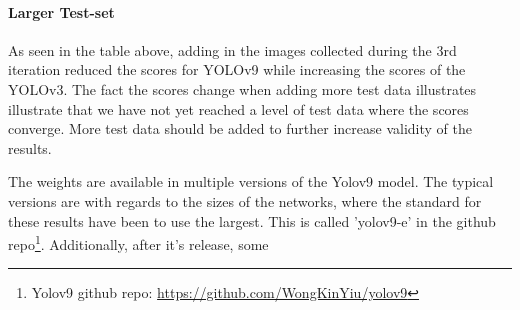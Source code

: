 \paragraph{Larger Test-set}
\label{sec:larger_test_set}
As seen in the table above, adding in the images collected during the 3rd iteration reduced the scores for YOLOv9 while increasing the scores of the YOLOv3. The fact the scores change when adding more test data illustrates illustrate that we have not yet reached a level of test data where the scores converge. More test data should be added to further increase validity of the results.

The weights are available in multiple versions of the Yolov9 model. The typical versions are with regards to the sizes of the networks, where the standard for these results have been to use the largest. This is called 'yolov9-e' in the github repo\footnote{Yolov9 github repo: \href{https://github.com/WongKinYiu/yolov9}{https://github.com/WongKinYiu/yolov9}}. Additionally, after it's release, some

\label{sec:results_heatmaps}